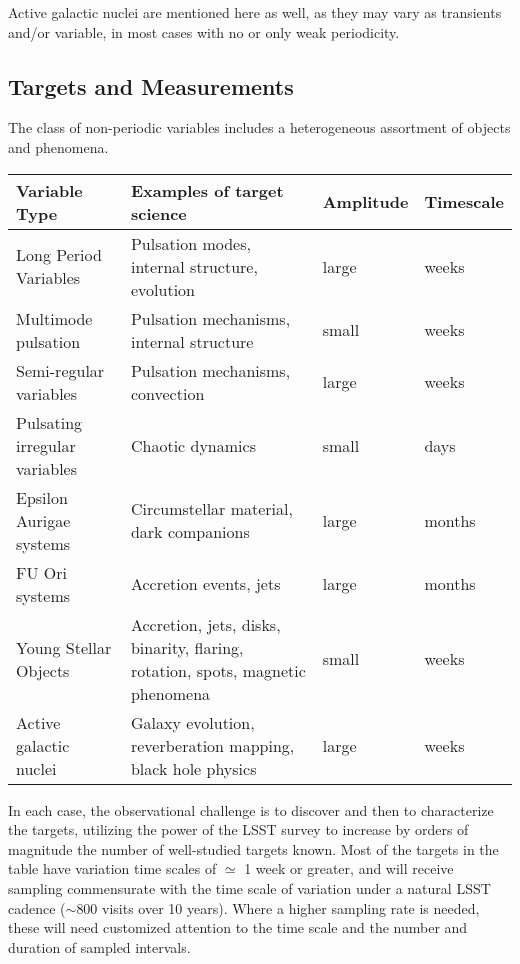 Active galactic nuclei are mentioned here as well, as they may vary as transients and/or variable, in most cases with no or only weak periodicity.


\subsection{Targets and Measurements}
\label{sec:\secname:targets}

The class of non-periodic variables includes a heterogeneous
assortment of objects and phenomena.

\begin{center}
\begin{tabular}{| p{5cm} | p{8cm} | l | l |}
\hline Variable Type & Examples of target science & Amplitude & Timescale\\
\hline
Long Period Variables & Pulsation modes, internal structure, evolution & large & weeks\\
Multimode pulsation & Pulsation mechanisms, internal structure& small & weeks\\
Semi-regular variables & Pulsation mechanisms, convection & large & weeks\\
Pulsating irregular variables & Chaotic dynamics  &  small & days \\
Epsilon Aurigae systems & Circumstellar material, dark companions& large & months\\
FU Ori systems & Accretion events, jets & large & months\\
Young Stellar Objects & Accretion, jets, disks, binarity, flaring, rotation, spots, magnetic phenomena & small & weeks\\
Active galactic nuclei & Galaxy evolution, reverberation mapping, black hole physics & large & weeks\\
 \hline \end{tabular}
 \end{center}

In each case, the observational challenge is to discover and then to
characterize the targets, utilizing the power of the LSST survey to
increase by orders of magnitude the number of well-studied targets
known.  Most of the targets in the table have variation time scales of
$\simeq$ 1 week or greater, and will receive sampling commensurate
with the time scale of variation under a natural LSST cadence
($\sim$800 visits over 10 years).  Where a higher sampling rate is
needed, these will need customized attention to the time scale and the
number and duration of sampled intervals.

